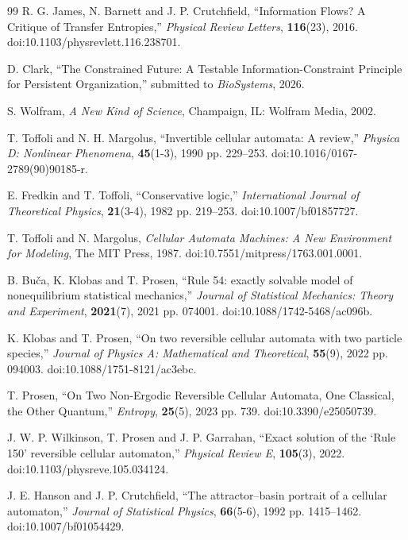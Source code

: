 \documentclass{article}
\begin{document}
\begin{thebibliography}{99}
R. G. James, N. Barnett and J. P. Crutchfield, ``Information Flows? A Critique of Transfer Entropies,'' \textit{Physical Review Letters}, \textbf{116}(23), 2016. doi:10.1103/physrevlett.116.238701.

D. Clark, ``The Constrained Future: A Testable Information-Constraint Principle for Persistent Organization,'' submitted to \textit{BioSystems}, 2026.

S. Wolfram, \textit{A New Kind of Science}, Champaign, IL: Wolfram Media, 2002.

T. Toffoli and N. H. Margolus, ``Invertible cellular automata: A review,'' \textit{Physica D: Nonlinear Phenomena}, \textbf{45}(1-3), 1990 pp. 229--253. doi:10.1016/0167-2789(90)90185-r.

E. Fredkin and T. Toffoli, ``Conservative logic,'' \textit{International Journal of Theoretical Physics}, \textbf{21}(3-4), 1982 pp. 219--253. doi:10.1007/bf01857727.

T. Toffoli and N. Margolus, \textit{Cellular Automata Machines: A New Environment for Modeling}, The MIT Press, 1987. doi:10.7551/mitpress/1763.001.0001.

B. Buča, K. Klobas and T. Prosen, ``Rule 54: exactly solvable model of nonequilibrium statistical mechanics,'' \textit{Journal of Statistical Mechanics: Theory and Experiment}, \textbf{2021}(7), 2021 pp. 074001. doi:10.1088/1742-5468/ac096b.

K. Klobas and T. Prosen, ``On two reversible cellular automata with two particle species,'' \textit{Journal of Physics A: Mathematical and Theoretical}, \textbf{55}(9), 2022 pp. 094003. doi:10.1088/1751-8121/ac3ebc.

T. Prosen, ``On Two Non-Ergodic Reversible Cellular Automata, One Classical, the Other Quantum,'' \textit{Entropy}, \textbf{25}(5), 2023 pp. 739. doi:10.3390/e25050739.

J. W. P. Wilkinson, T. Prosen and J. P. Garrahan, ``Exact solution of the `Rule 150' reversible cellular automaton,'' \textit{Physical Review E}, \textbf{105}(3), 2022. doi:10.1103/physreve.105.034124.

J. E. Hanson and J. P. Crutchfield, ``The attractor--basin portrait of a cellular automaton,'' \textit{Journal of Statistical Physics}, \textbf{66}(5-6), 1992 pp. 1415--1462. doi:10.1007/bf01054429.


\end{thebibliography}
\end{document}
